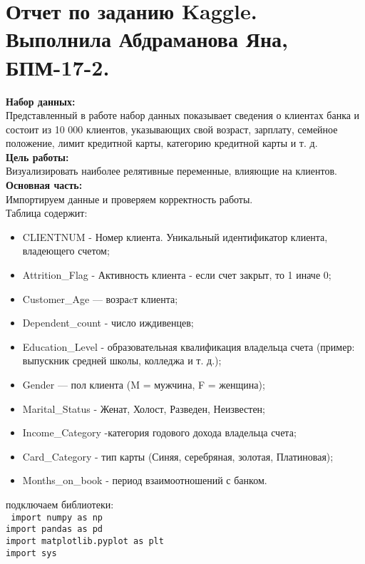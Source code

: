 \documentclass[12pt,a4paper,preview]{article}
\begin{document}
\linespread{1.5}

\section*{\huge{Отчет по заданию Kaggle. \\Выполнила Абдраманова Яна, БПМ-17-2.}}

\hfill \break

\textbf{Набор данных:}\\
Представленный в работе набор данных показывает сведения о клиентах банка и состоит из 10 000 клиентов, указывающих свой возраст, зарплату, семейное положение, лимит кредитной карты, категорию кредитной карты и т. д. \\

\textbf{Цель работы:}\\
Визуализировать наиболее релятивные переменные, влияющие на клиентов. \\
\textbf{Основная часть:}\\
Импортируем данные и проверяем корректность работы.\\
Таблица содержит:\\
 \begin{itemize}
   \item 
   CLIENTNUM - Номер клиента. Уникальный идентификатор клиента, владеющего счетом;
   \item
   Attrition\_Flag - Активность клиента - если счет закрыт, то 1 иначе 0;
   \item 
   Customer\_Age — возраcт клиента;
   \item 
   Dependent\_count - число иждивенцев;
   \item
   Education\_Level - образовательная квалификация владельца счета (пример: выпускник средней школы, колледжа и т. д.);
   \item
   Gender — пол клиента (M = мужчина, F = женщина);
   \item
   Marital\_Status - Женат, Холост, Разведен, Неизвестен;
   \item
   Income\_Category -категория годового дохода владельца счета;
   \item
   Card\_Category - тип карты (Синяя, серебряная, золотая, Платиновая);
   \item
   Months\_on\_book - период взаимоотношений с банком.
 \end{itemize}
подключаем библиотеки:\\
\noindent\texttt{
import numpy as np\\
import pandas as pd\\
import matplotlib.pyplot as plt\\
import sys\\}
\end{document}
